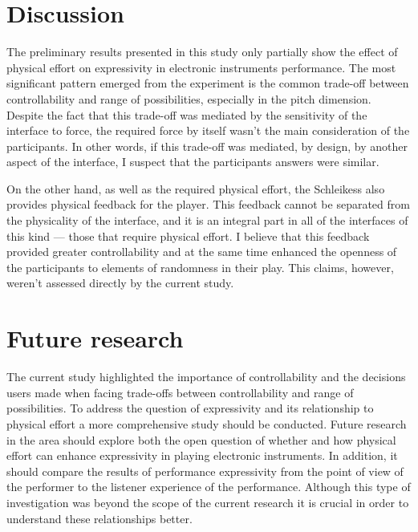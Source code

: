 \documentclass{sigchi}
\begin{document}
\section{Discussion}

The preliminary results presented in this study only partially show the effect of physical effort on expressivity in electronic instruments performance.
The most significant pattern emerged from the experiment is the common trade-off between controllability and range of possibilities, especially in the pitch dimension.
Despite the fact that this trade-off was mediated by the sensitivity of the interface to force, the required force by itself wasn't the main consideration of the participants.
In other words, if this trade-off was mediated, by design, by another aspect of the interface, I suspect that the participants answers were similar.

On the other hand, as well as the required physical effort, the Schleikess also provides physical feedback for the player.
This feedback cannot be separated from the physicality of the interface, and it is an integral part in all of the interfaces of this kind --- those that require physical effort.
I believe that this feedback provided greater controllability and at the same time enhanced the openness of the participants to elements of randomness in their play.
This claims, however, weren't assessed directly by the current study.

\section{Future research}

The current study highlighted the importance of controllability and the decisions users made when facing trade-offs between controllability and range of possibilities.
To address the question of expressivity and its relationship to physical effort a more comprehensive study should be conducted.
Future research in the area should explore both the open question of whether and how physical effort can enhance expressivity in playing electronic instruments.
In addition, it should compare the results of performance expressivity from the point of view of the performer to the listener experience of the performance.
Although this type of investigation was beyond the scope of the current research it is crucial in order to understand these relationships better.

\balance{}



\end{document}
